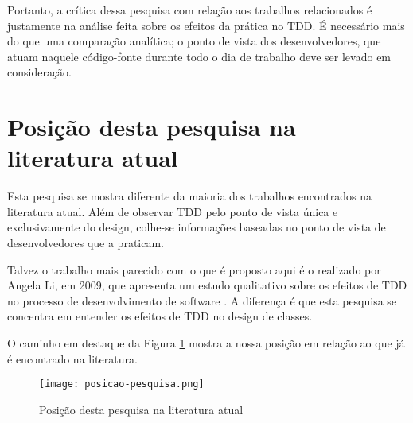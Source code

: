 Portanto, a crítica dessa pesquisa
com relação aos trabalhos relacionados é justamente na análise feita sobre os
efeitos da prática no TDD. É necessário mais do que uma comparação analítica; o
ponto de vista dos desenvolvedores, que atuam naquele código-fonte durante todo
o dia de trabalho deve ser levado em consideração.

\section{Posição desta pesquisa na literatura atual}

Esta pesquisa se mostra diferente da maioria dos trabalhos encontrados na
literatura atual. Além de observar TDD pelo ponto de vista única e
exclusivamente do design, colhe-se informações baseadas no ponto de
vista de desenvolvedores que a praticam.

Talvez o trabalho mais parecido com o que é proposto aqui é o
realizado por Angela Li, em 2009, que apresenta um estudo qualitativo sobre os
efeitos de TDD no processo de desenvolvimento de software \cite{angela-li}. 
A diferença é que esta pesquisa se concentra em entender os
efeitos de TDD no design de classes.

O caminho em destaque da Figura \ref{fig:posicao-pesquisa} mostra a nossa posição
em relação ao que já é encontrado na literatura.

\begin{figure}[h!]
  \centering
  \texttt{[image: posicao-pesquisa.png]}
  \caption{Posição desta pesquisa na literatura atual}
  \label{fig:posicao-pesquisa}
\end{figure}

